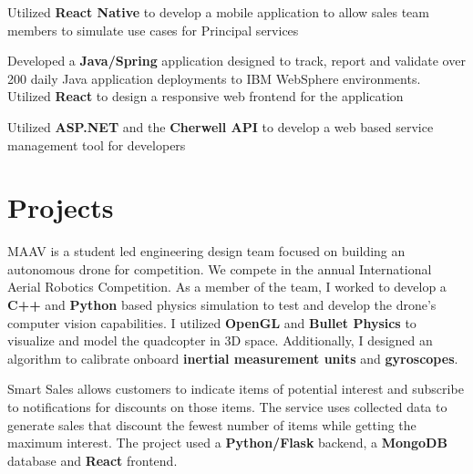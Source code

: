 \documentclass[letterpaper]{deedy-resume} %
\begin{document}
\begin{minipage}[t]{0.66\textwidth}


\begin{tightitemize}
\item Utilized {\bf React Native} to develop a mobile application to allow sales team members to simulate use cases for Principal services
\item Developed a {\bf Java/Spring} application designed to track, report and validate over 200 daily Java application deployments to IBM WebSphere environments. Utilized {\bf React} to design a responsive web frontend for the application
\item Utilized {\bf ASP.NET} and the {\bf Cherwell API} to develop a web based service management tool for developers
\end{tightitemize}

\sectionspace %


\section{Projects}


MAAV is a student led engineering design team focused on building an autonomous drone for competition. We compete in the annual International Aerial Robotics Competition. As a member of the team, I worked to develop a {\bf C++} and {\bf Python} based physics simulation to test and develop the drone’s computer vision capabilities. I utilized {\bf OpenGL} and {\bf Bullet Physics} to visualize and model the quadcopter in 3D space. Additionally, I designed an algorithm to calibrate onboard {\bf inertial measurement units} and {\bf gyroscopes}.

\sectionspace %



Smart Sales allows customers to indicate items of potential interest and subscribe to notifications for discounts on those items. The service uses collected data to generate sales that discount the fewest number of items while getting the maximum interest. The project used a {\bf Python/Flask} backend, a {\bf MongoDB} database and {\bf React} frontend.



\end{minipage}
\end{document}
